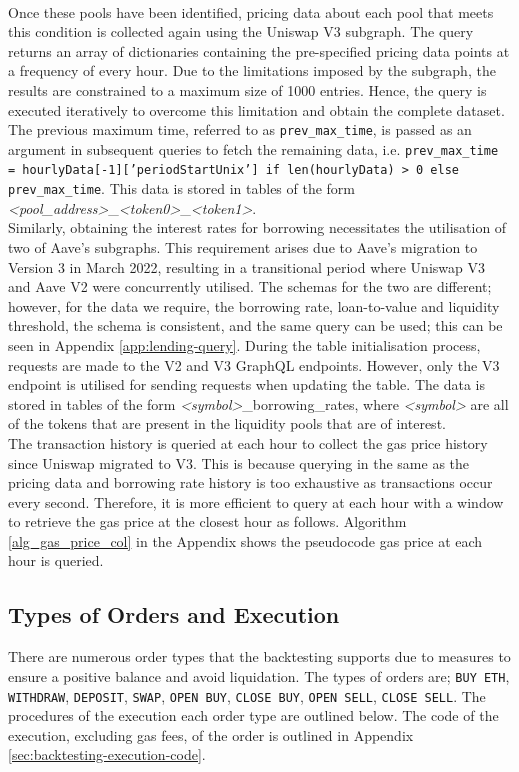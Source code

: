 \\[3mm]
Once these pools have been identified, pricing data about each pool that meets this condition is collected again using the Uniswap V3 subgraph. The query returns an array of dictionaries containing the pre-specified pricing data points at a frequency of every hour. Due to the limitations imposed by the subgraph, the results are constrained to a maximum size of 1000 entries. Hence, the query is executed iteratively to overcome this limitation and obtain the complete dataset. The previous maximum time, referred to as \texttt{prev\_max\_time}, is passed as an argument in subsequent queries to fetch the remaining data, i.e. \texttt{prev\_max\_time = hourlyData[-1]['periodStartUnix'] if len(hourlyData) > 0 else prev\_max\_time}. This data is stored in tables of the form \textit{<pool\_address>}\_\textit{<token0>}\_\textit{<token1>}.
\\[3mm]
Similarly, obtaining the interest rates for borrowing necessitates the utilisation of two of Aave's subgraphs. This requirement arises due to Aave's migration to Version 3 in March 2022, resulting in a transitional period where Uniswap V3 and Aave V2 were concurrently utilised. The schemas for the two are different; however, for the data we require, the borrowing rate, loan-to-value and liquidity threshold, the schema is consistent, and the same query can be used; this can be seen in Appendix \ref{app:lending-query}. During the table initialisation process, requests are made to the V2 and V3 GraphQL endpoints. However, only the V3 endpoint is utilised for sending requests when updating the table. The data is stored in tables of the form \textit{<symbol>}\_borrowing\_rates, where \textit{<symbol>} are all of the tokens that are present in the liquidity pools that are of interest.
\\[3mm]
The transaction history is queried at each hour to collect the gas price history since Uniswap migrated to V3. This is because querying in the same as the pricing data and borrowing rate history is too exhaustive as transactions occur every second. Therefore, it is more efficient to query at each hour with a window to retrieve the gas price at the closest hour as follows. Algorithm \ref{alg_gas_price_col} in the Appendix shows the pseudocode gas price at each hour is queried. 
\subsection{Types of Orders and Execution}
There are numerous order types that the backtesting supports due to measures to ensure a positive balance and avoid liquidation. The types of orders are; \texttt{BUY\ ETH}, \texttt{WITHDRAW}, \texttt{DEPOSIT}, \texttt{SWAP}, \texttt{OPEN\ BUY}, \texttt{CLOSE\ BUY}, \texttt{OPEN\ SELL}, \texttt{CLOSE\ SELL}. The procedures of the execution each order type are outlined below. The code of the execution, excluding gas fees, of the order is outlined in Appendix \ref{sec:backtesting-execution-code}.
\vspace{-3mm}

